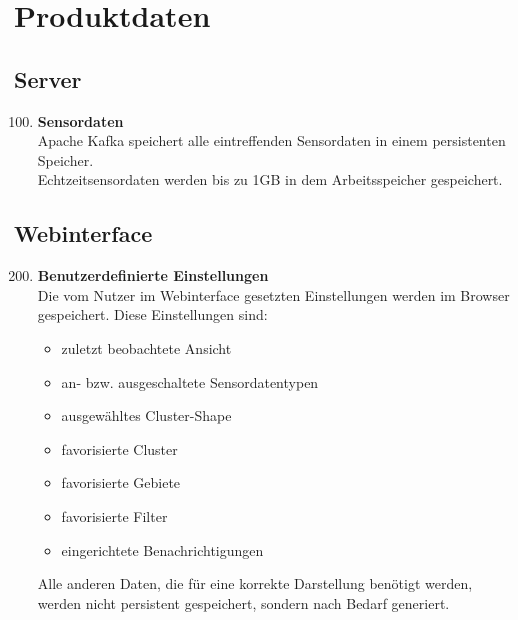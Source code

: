 \chapter{Produktdaten}
\section{Server}
\begin{enumerate}[label=\textbf{PD\arabic{enumi}0}]
	\setcounter{enumi}{99}
	\item \textbf{Sensordaten}\\
	Apache Kafka speichert alle eintreffenden Sensordaten in einem persistenten Speicher.\\
	Echtzeitsensordaten werden bis zu 1GB in dem Arbeitsspeicher gespeichert.
\end{enumerate}
\section{Webinterface}
\begin{enumerate}[label=\textbf{PD\arabic{enumi}0}]
	\setcounter{enumi}{199}
	\item \textbf{Benutzerdefinierte Einstellungen}\\
	Die vom Nutzer im Webinterface gesetzten Einstellungen werden im Browser gespeichert. Diese Einstellungen sind:
	\begin{itemize}
		\item zuletzt beobachtete Ansicht
		\item an- bzw. ausgeschaltete Sensordatentypen
		\item ausgewähltes Cluster-Shape
		\item favorisierte Cluster
		\item favorisierte Gebiete
		\item favorisierte Filter
		\item eingerichtete Benachrichtigungen
	\end{itemize}
	Alle anderen Daten, die für eine korrekte Darstellung benötigt werden, werden nicht persistent gespeichert, sondern nach Bedarf generiert.
\end{enumerate}